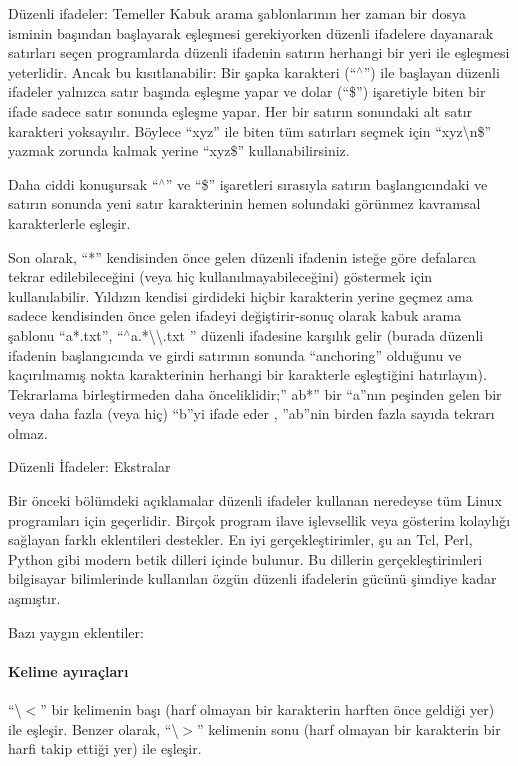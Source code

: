 \begin{section}{Düzenli ifadeler: Temeller}
Kabuk arama şablonlarının her zaman bir dosya isminin başından başlayarak eşleşmesi gerekiyorken düzenli ifadelere dayanarak satırları seçen programlarda düzenli ifadenin satırın herhangi bir yeri ile eşleşmesi yeterlidir. Ancak bu kısıtlanabilir: Bir şapka karakteri (“$ ^\wedge $”) ile başlayan düzenli ifadeler yalnızca satır başında eşleşme yapar ve dolar (“\$”) işaretiyle biten bir ifade sadece satır sonunda eşleşme yapar. Her bir satırın sonundaki alt satır karakteri yoksayılır. Böylece “xyz” ile biten tüm satırları seçmek için “xyz\textbackslash n\$” yazmak zorunda kalmak yerine “xyz\$” kullanabilirsiniz.

Daha ciddi konuşursak “$ ^\wedge $” ve “\$” işaretleri sırasıyla satırın başlangıcındaki ve satırın sonunda yeni satır karakterinin hemen solundaki görünmez kavramsal karakterlerle eşleşir.

Son olarak, “*” kendisinden önce gelen düzenli ifadenin isteğe göre defalarca tekrar edilebileceğini (veya hiç kullanılmayabileceğini) göstermek için kullanılabilir. Yıldızın kendisi girdideki hiçbir karakterin yerine geçmez ama sadece kendisinden önce gelen ifadeyi değiştirir-sonuç olarak kabuk arama şablonu “a*.txt”, “$ ^\wedge $a.*\textbackslash \textbackslash.txt ” düzenli ifadesine karşılık gelir (burada düzenli ifadenin başlangıcında ve girdi satırının sonunda “anchoring” olduğunu ve kaçırılmamış nokta karakterinin herhangi bir karakterle eşleştiğini hatırlayın). Tekrarlama birleştirmeden daha önceliklidir;” ab*” bir “a”nın peşinden gelen bir veya daha fazla (veya hiç) “b”yi ifade eder , ”ab”nin birden fazla sayıda tekrarı olmaz.

\begin{subsection}{Düzenli İfadeler: Ekstralar} \label{sec:bolum711}

Bir önceki bölümdeki açıklamalar düzenli ifadeler kullanan neredeyse tüm Linux programları için geçerlidir. Birçok program ilave işlevsellik veya gösterim kolaylığı sağlayan farklı eklentileri destekler. En iyi gerçekleştirimler, şu an Tcl, Perl, Python gibi modern betik dilleri içinde bulunur. Bu dillerin gerçekleştirimleri bilgisayar bilimlerinde kullanılan özgün düzenli ifadelerin gücünü şimdiye kadar aşmıştır.

Bazı yaygın eklentiler:

\paragraph{Kelime ayıraçları}{“\textbackslash $<$” bir kelimenin başı (harf olmayan bir karakterin harften önce geldiği yer) ile eşleşir. Benzer olarak, “\textbackslash$>$” kelimenin sonu (harf olmayan bir karakterin bir harfi takip ettiği yer) ile eşleşir.}

\end{subsection}
\end{section}
